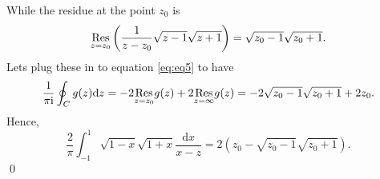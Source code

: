 \documentclass[10pt]{amsart}
\newcommand{\D}{\mathrm{d}}
\newcommand{\I}{\mathrm{i}}
\theoremstyle{nonumberplain}
\begin{document}
\begin{enumerate}[label={\bf {\arabic*}:}]
\begin{enumerate}
$$$$
While the residue at the point $z_0$ is 
$$
\underset{z=z_0}{{\rm Res}} \left( \frac 1 {z - z_0} \sqrt {z - 1} \sqrt {z + 1} \right) = \sqrt {z_0 - 1} \sqrt {z_0 + 1}.
$$
Lets plug these in to equation \eqref{eq:eq5} to have
\begin{align*}
\frac 1 {\pi \I} \oint_C g(z) \D z
	= - 2 \underset{z=z_0}{{\rm Res}} g(z) + 2 \underset{z=\infty}{{\rm Res}} g(z)
	=  - 2 \sqrt {z_0 - 1} \sqrt {z_0 + 1} + 2z_0.
\end{align*}
Hence,
$$
\frac{2}{\pi}\int_{-1}^1 {\sqrt{1-x} \sqrt{1 + x}} \frac{\D x}{x -z} = 2 (z_0 - \sqrt {z_0 - 1} \sqrt {z_0 + 1}).
$$
\qed \\

\end{enumerate}

      
    


  
\end{enumerate}
\end{document}
